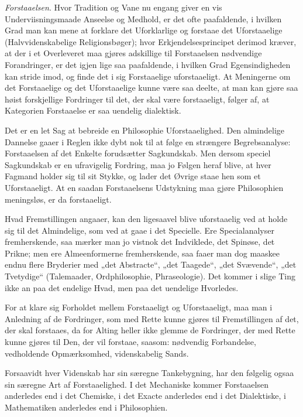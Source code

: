 \documentclass[12pt]{book}
\newcommand{\opage}[1]{\marginnote{\footnotesize\textit{[#1]}}}
\begin{document}
\emph{Forstaaelsen}. Hvor Tradition og Vane nu engang giver en vis Underviisningsmaade
Anseelse og Medhold, er det ofte paafaldende, i hvilken Grad man kan mene at forklare det
Uforklarlige og forstaae det Uforstaaelige (Halvvidenskabelige Religionsbøger); hvor
Erkjendelsesprincipet derimod kræver, at der i et Overleveret maa gjøres adskillige til
Forstaaelsen nødvendige Forandringer, er det igjen lige%
\opage{110}saa paafaldende, i hvilken Grad Egensindigheden kan stride imod, og finde det i sig
Forstaaelige uforstaaeligt. At Meningerne om det Forstaaelige og det Uforstaaelige kunne
være saa deelte, at man kan gjøre saa høist forskjellige Fordringer til det, der skal være
forstaaeligt, følger af, at Kategorien Forstaaelse er saa uendelig dialektisk.

Det er en let Sag at bebreide en Philosophie Uforstaaelighed. Den almindelige Dannelse gaaer
i Reglen ikke dybt nok til at følge en strængere Begrebsanalyse: Forstaaelsen af det Enkelte
forudsætter Sagkundskab. Men dersom speciel Sagkundskab er en ufravigelig Fordring, maa jo
Følgen heraf blive, at hver Fagmand holder sig til sit Stykke, og lader det Øvrige staae hen
som et Uforstaaeligt. At en saadan Forstaaelsens Udstykning maa gjøre Philosophien
meningsløs, er da forstaaeligt.

Hvad Fremstillingen angaaer, kan den ligesaavel blive uforstaaelig ved at holde sig til det
Almindelige, som ved at gaae i det Specielle. Ere Specialanalyser fremherskende, saa mærker
man jo vistnok det Indviklede, det Spinøse, det Prikne; men ere Almeenformerne
fremherskende, saa faaer man dog maaskee endnu flere Bryderier med „det Abstracte“, „det
Taagede“, „det Svævende“, „det Tvetydige“ (Talemaader, Ordphilosophie, Phraseologie). Det
kommer i slige Ting ikke an paa det endelige Hvad, men paa det uendelige Hvorledes.

For at klare sig Forholdet mellem Forstaaeligt og Uforstaaeligt, maa man i Anledning af de
Fordringer, som med Rette kunne gjøres til Fremstillingen af det, der skal forstaaes, da for
Alting heller ikke glemme de Fordringer, der med Rette kunne gjøres til Den, der vil
forstaae, saasom: nødvendig Forbandelse, vedholdende Opmærksomhed, videnskabelig Sands.

Forsaavidt hver Videnskab har sin særegne Tankebygning, har den følgelig ogsaa sin særegne
Art af Forstaaelighed. I det Mechaniske kommer Forstaaelsen anderledes end
\opage{111} i det Chemiske, i det Exacte anderledes end i det Dialektiske, i Mathematiken anderledes end
i Philosophien.
\end{document}
